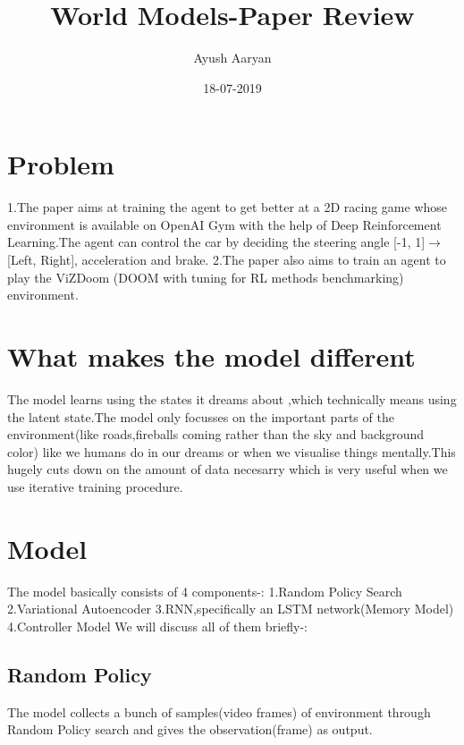 \documentclass{article}
\title{World Models-Paper Review}
\author{Ayush Aaryan}
\date{18-07-2019}
\begin{document}
\maketitle
{}
{}

\section{Problem}

1.The paper aims at training the agent to get better at a 2D racing game whose environment is available on OpenAI Gym with the help of Deep Reinforcement Learning.The agent can control the car by deciding the steering angle [-1, 1]$\rightarrow$[Left, Right], acceleration and brake.\newline
2.The paper also aims to train an agent to play the ViZDoom (DOOM with tuning for RL methods benchmarking) environment.\newline

\section{What makes the model different}
The model learns using the states it dreams about ,which technically means using the latent state.The model only focusses on the important parts of the environment(like roads,fireballs coming rather than the sky and background color) like we humans do in our dreams or when we visualise things mentally.This hugely cuts down on the amount of data necesarry which is very useful when we use iterative training procedure. 
\section{Model}

The model basically consists of 4 components-:\newline
1.Random Policy Search\newline
2.Variational Autoencoder\newline
3.RNN,specifically an LSTM network(Memory Model)\newline
4.Controller Model\newline\newline
We will discuss all of them briefly-:
\newline
\subsection{Random Policy}
The model collects a bunch of samples(video frames) of environment through Random Policy search and gives the observation(frame) as output.
\end{document}
